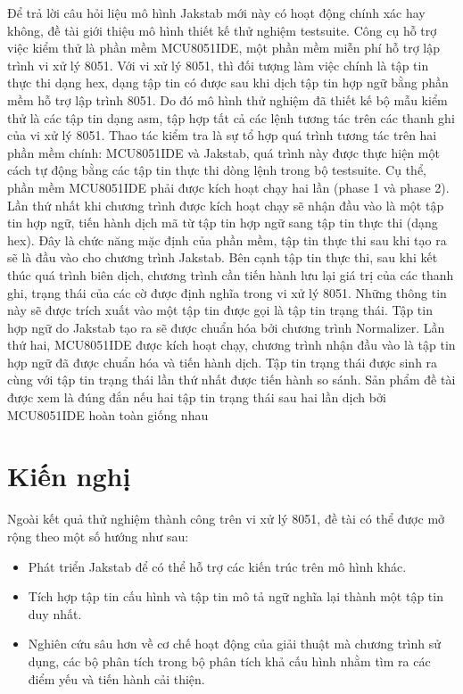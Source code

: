 	Để trả lời câu hỏi liệu mô hình Jakstab mới này có hoạt động chính xác hay không, đề tài giới thiệu mô hình thiết kế thử nghiệm testsuite. Công cụ hỗ trợ việc kiểm thử là phần mềm MCU8051IDE, một phần mềm miễn phí hỗ trợ lập trình vi xử lý 8051. Với vi xử lý 8051, thì đối tượng làm việc chính là tập tin thực thi dạng hex, dạng tập tin có được sau khi dịch tập tin hợp ngữ bằng phần mềm hỗ trợ lập trình 8051. Do đó mô hình thử nghiệm đã thiết kế bộ mẫu kiểm thử là các tập tin dạng asm, tập hợp tất cả các lệnh tương tác trên các thanh ghi của vi xử lý 8051. Thao tác kiểm tra là sự tổ hợp quá trình tương tác trên hai phần mềm chính: MCU8051IDE và Jakstab, quá trình này được thực hiện một cách tự động bằng các tập tin thực thi dòng lệnh trong bộ testsuite. Cụ thể, phần mềm MCU8051IDE phải được kích hoạt chạy hai lần (phase 1 và phase 2). Lần thứ nhất khi chương trình được kích hoạt chạy sẽ nhận đầu vào là một tập tin hợp ngữ, tiến hành dịch mã từ tập tin hợp ngữ sang tập tin thực thi (dạng hex). Đây là chức năng mặc định của phần mềm, tập tin thực thi sau khi tạo ra sẽ là đầu vào cho chương trình Jakstab. Bên cạnh tập tin thực thi, sau khi kết thúc quá trình biên dịch, chương trình cần tiến hành lưu lại giá trị của các thanh ghi, trạng thái của các cờ được định nghĩa trong vi xử lý 8051. Những thông tin này sẽ được trích xuất vào một tập tin được gọi là tập tin trạng thái. Tập tin hợp ngữ do Jakstab tạo ra sẽ được chuẩn hóa bởi chương trình Normalizer. Lần thứ hai, MCU8051IDE được kích hoạt chạy, chương trình nhận đầu vào là tập tin hợp ngữ đã được chuẩn hóa và tiến hành dịch. Tập tin trạng thái được sinh ra cùng với tập tin trạng thái lần thứ nhất được tiến hành so sánh. Sản phẩm đề tài được xem là đúng đắn nếu hai tập tin trạng thái sau hai lần dịch bởi MCU8051IDE hoàn toàn giống nhau


\section*{Kiến nghị}
	Ngoài kết quả thử nghiệm thành công trên vi xử lý 8051, đề tài có thể được mở rộng theo một số hướng như sau:
	\begin{itemize}
		\item Phát triển Jakstab để có thể hỗ trợ các kiến trúc trên mô hình khác.
		\item Tích hợp tập tin cấu hình và tập tin mô tả ngữ nghĩa lại thành một tập tin duy nhất.
		\item Nghiên cứu sâu hơn về cơ chế hoạt động của giải thuật mà chương trình sử dụng, các bộ phân tích trong bộ phân tích khả cấu hình nhằm tìm ra các điểm yếu và tiến hành cải thiện.
	\end{itemize}
